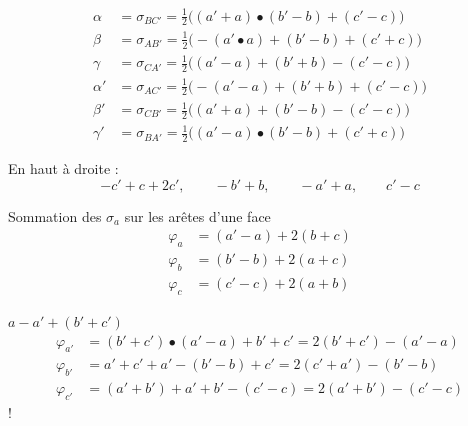 \documentclass[11pt,a4paper]{article}
\begin{document}
\begin{align*}
\alpha &= \sigma_{BC'} = \tfrac12\bigl((a'+a) \bullet (b'-b) + (c'-c)\bigr)\\
\beta &= \sigma_{AB'} = \tfrac12\bigl(-(a' \bullet a) + (b'-b) + (c'+c)\bigr)\\
\gamma &= \sigma_{CA'} = \tfrac12\bigl((a'-a) + (b'+b) - (c'-c)\bigr)\\
\alpha' &= \sigma_{AC'} = \tfrac12\bigl(-(a'-a) + (b'+b) + (c'-c)\bigr)\\
\beta' &= \sigma_{CB'} = \tfrac12\bigl((a'+a) + (b'-b) - (c'-c)\bigr)\\
\gamma' &= \sigma_{BA'} = \tfrac12\bigl((a'-a) \bullet (b'-b) + (c'+c)\bigr)
\end{align*}

En haut à droite :
\[
-c' + c + 2c',\qquad -b' + b,\qquad -a' + a,\qquad c' - c
\]

Sommation des $\sigma_a$ sur les arêtes d'une face
\begin{align*}
\varphi_a &= (a'-a) + 2(b+c)\\
\varphi_b &= (b'-b) + 2(a+c)\\
\varphi_c &= (c'-c) + 2(a+b)
\end{align*}

$a - a' + (b'+c')$
\begin{align*}
\varphi_{a'} &= (b'+c') \bullet (a'-a) + b' + c' = 2(b'+c') - (a'-a)\\
\varphi_{b'} &= a' + c' + a' - (b'-b) + c' = 2(c'+a') - (b'-b)\\
\varphi_{c'} &= (a'+b') + a' + b' - (c'-c) = 2(a'+b') - (c'-c)
\end{align*}
\struck{\ill{}} !
\end{document}
